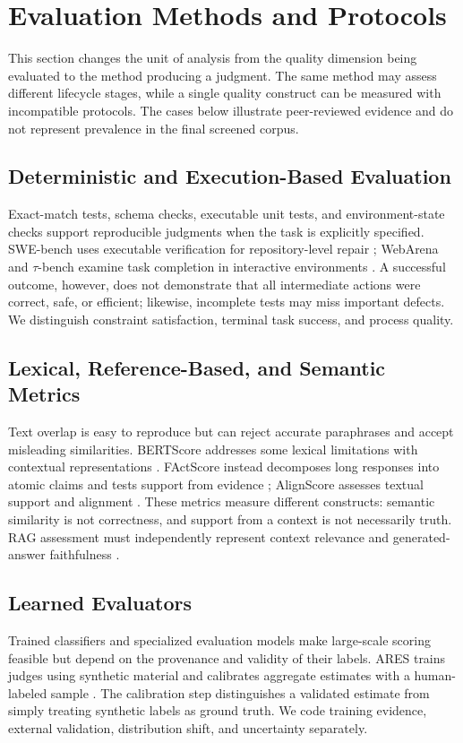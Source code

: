 \section{Evaluation Methods and Protocols}
\label{sec:evaluation-methods}
This section changes the unit of analysis from the quality dimension being evaluated to the method producing a judgment. The same method may assess different lifecycle stages, while a single quality construct can be measured with incompatible protocols. The cases below illustrate peer-reviewed evidence and do not represent prevalence in the final screened corpus.

\subsection{Deterministic and Execution-Based Evaluation}
Exact-match tests, schema checks, executable unit tests, and environment-state checks support reproducible judgments when the task is explicitly specified. SWE-bench uses executable verification for repository-level repair \cite{jimenez2024swebench}; WebArena and $\tau$-bench examine task completion in interactive environments \cite{zhou2024webarena,yao2025taubench}. A successful outcome, however, does not demonstrate that all intermediate actions were correct, safe, or efficient; likewise, incomplete tests may miss important defects. We distinguish constraint satisfaction, terminal task success, and process quality.

\subsection{Lexical, Reference-Based, and Semantic Metrics}
Text overlap is easy to reproduce but can reject accurate paraphrases and accept misleading similarities. BERTScore addresses some lexical limitations with contextual representations \cite{zhang2020bertscore}. FActScore instead decomposes long responses into atomic claims and tests support from evidence \cite{min2023factscore}; AlignScore assesses textual support and alignment \cite{zha2023alignscore}. These metrics measure different constructs: semantic similarity is not correctness, and support from a context is not necessarily truth. RAG assessment must independently represent context relevance and generated-answer faithfulness \cite{es2024ragas}.

\subsection{Learned Evaluators}
Trained classifiers and specialized evaluation models make large-scale scoring feasible but depend on the provenance and validity of their labels. ARES trains judges using synthetic material and calibrates aggregate estimates with a human-labeled sample \cite{saadfalcon2024ares}. The calibration step distinguishes a validated estimate from simply treating synthetic labels as ground truth. We code training evidence, external validation, distribution shift, and uncertainty separately.

